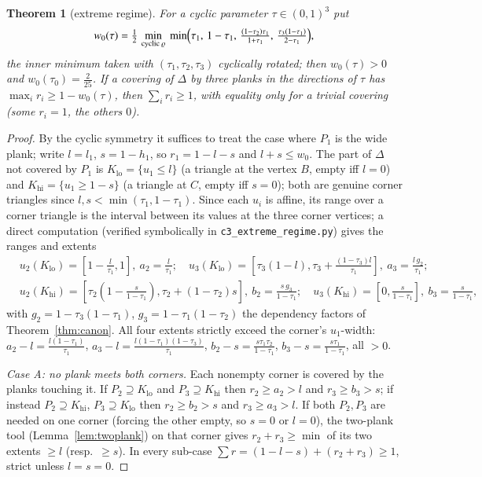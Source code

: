 \documentclass{aims}
\numberwithin{equation}{section}
\theoremstyle{plain}
\newtheorem{theorem}{Theorem}[section]
\theoremstyle{definition}
\theoremstyle{remark}
\begin{document}
\begin{theorem}[extreme regime]\label{thm:extreme}
For a cyclic parameter $\tau\in(0,1)^3$ put
\[
w_0(\tau)=\tfrac12\,\min_{\text{cyclic }\varrho}\ \min\Bigl(\tau_1,\,1-\tau_1,\,
\tfrac{(1-\tau_2)\tau_1}{1+\tau_1},\,\tfrac{\tau_3(1-\tau_1)}{2-\tau_1}\Bigr),
\]
the inner minimum taken with $(\tau_1,\tau_2,\tau_3)$ cyclically rotated; then
$w_0(\tau)>0$ and $w_0(\tau_0)=\tfrac2{25}$. If a covering of $\Delta$ by three
planks in the directions of $\tau$ has $\max_i r_i\ge1-w_0(\tau)$, then
$\sum_i r_i\ge1$, with equality only for a trivial covering (some $r_i=1$, the
others $0$).
\end{theorem}
\begin{proof}
By the cyclic symmetry it suffices to treat the case where $P_1$ is the wide
plank; write $l=l_1$, $s=1-h_1$, so $r_1=1-l-s$ and $l+s\le w_0$. The part of
$\Delta$ not covered by $P_1$ is $K_{\mathrm{lo}}=\{u_1\le l\}$ (a triangle at
the vertex $B$, empty iff $l=0$) and $K_{\mathrm{hi}}=\{u_1\ge1-s\}$ (a
triangle at $C$, empty iff $s=0$); both are genuine corner triangles since
$l,s<\min(\tau_1,1-\tau_1)$. Since each $u_i$ is affine, its range over a
corner triangle is the interval between its values at the three corner
vertices; a direct computation (verified symbolically in
\texttt{c3\_extreme\_regime.py}) gives the ranges and extents
\[
\begin{aligned}
&u_2(K_{\mathrm{lo}})=[1-\tfrac l{\tau_1},1],\ a_2=\tfrac l{\tau_1};\quad
u_3(K_{\mathrm{lo}})=[\tau_3(1-l),\tau_3+\tfrac{(1-\tau_3)l}{\tau_1}],\
a_3=\tfrac{l\,g_2}{\tau_1};\\
&u_2(K_{\mathrm{hi}})=[\tau_2(1-\tfrac s{1-\tau_1}),\tau_2+(1-\tau_2)s],\
b_2=\tfrac{s\,g_3}{1-\tau_1};\quad
u_3(K_{\mathrm{hi}})=[0,\tfrac s{1-\tau_1}],\ b_3=\tfrac s{1-\tau_1},
\end{aligned}
\]
with $g_2=1-\tau_3(1-\tau_1)$, $g_3=1-\tau_1(1-\tau_2)$ the dependency factors
of Theorem~\ref{thm:canon}. All four extents strictly exceed the corner's
$u_1$-width: $a_2-l=\tfrac{l(1-\tau_1)}{\tau_1}$, $a_3-l=\tfrac{l(1-\tau_1)
(1-\tau_3)}{\tau_1}$, $b_2-s=\tfrac{s\tau_1\tau_2}{1-\tau_1}$,
$b_3-s=\tfrac{s\tau_1}{1-\tau_1}$, all $>0$.

\emph{Case A: no plank meets both corners.} Each nonempty corner is covered by
the planks touching it. If $P_2\supseteq K_{\mathrm{lo}}$ and
$P_3\supseteq K_{\mathrm{hi}}$ then $r_2\ge a_2>l$ and $r_3\ge b_3>s$; if
instead $P_2\supseteq K_{\mathrm{hi}}$, $P_3\supseteq K_{\mathrm{lo}}$ then
$r_2\ge b_2>s$ and $r_3\ge a_3>l$. If both $P_2,P_3$ are needed on one corner
(forcing the other empty, so $s=0$ or $l=0$), the two-plank tool
(Lemma~\ref{lem:twoplank}) on that corner gives $r_2+r_3\ge\min$ of its two
extents $\ge l$ (resp.\ $\ge s$). In every sub-case
$\sum r=(1-l-s)+(r_2+r_3)\ge1$, strict unless $l=s=0$.


\end{proof}
\end{document}
